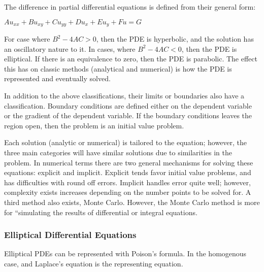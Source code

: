 \documentclass[11pt]{article}
\begin{document}
The difference in partial differential equations is defined from their general form:

$Au_{xx} + Bu_{xy} +Cu_{yy} +Du_{x} + Eu_{y} + Fu = G$

For case where $B^2 - 4AC > 0 $, then the PDE is hyperbolic, and the solution has an oscillatory nature to it.  In cases, where  $B^2 - 4AC < 0 $,  then the PDE is elliptical.  If there is an equivalence to zero, then the PDE is parabolic.  The effect this has on classic methods (analytical and numerical) is how the PDE is represented and eventually solved.  


In addition to the above classifications, %
their limits or boundaries also have a classification.   Boundary conditions are defined either on the dependent variable or the gradient of the dependent variable.  If the boundary conditions leaves the region open, then the problem is an initial value problem.   %



Each solution (analytic or numerical) is tailored to the equation; however, the three main categories will have similar solutions due to similarities in the problem.
In numerical terms there are two general mechanisms for solving these equations: explicit and implicit.  Explicit tends favor initial value problems, and has difficulties with round off errors.  Implicit handles error quite well; however, complexity exists increases depending on the number points to be solved for.  A third method also exists, Monte Carlo.  However, the Monte Carlo method is more for ``simulating the results of differential or integral equations.  




\subsubsection {Elliptical Differential Equations} 
Elliptical PDEs can be represented with Poison's formula.  In the homogenous case, and Laplace's equation is the representing equation.
\end{document}
